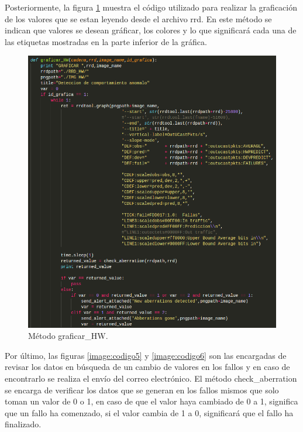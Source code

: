 Posteriormente, la figura \ref{image:codigo2} muestra el código utilizado para realizar la graficación de los valores que se estan leyendo desde el archivo rrd. En este método se indican que valores se desean gráficar, los colores y lo que significará cada una de las etiquetas mostradas en la parte inferior de la gráfica.
\FloatBarrier
\begin{figure}[htbp!]
		\centering
			\includegraphics[width=1 \textwidth]{images/codigo2}
		\caption{Método graficar\_HW.}
		\label{image:codigo2}
\end{figure}
\FloatBarrier
Por último, las figuras \ref{image:codigo5} y \ref{image:codigo6} son las encargadas de revisar los datos en búsqueda de un cambio de valores en los fallos y en caso de encontrarlo se realiza el envío del correo electrónico.
El método check\_aberration se encarga de verificar los datos que se generan en los fallos mismos que solo toman un valor de 0 o 1, en caso de que el valor haya cambiado de 0 a 1, significa que un fallo ha comenzado, si el valor cambia de 1 a 0, significará que el fallo ha finalizado.
\FloatBarrier
